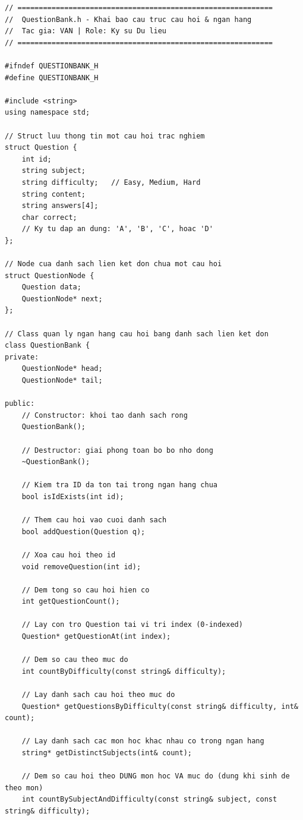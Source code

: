 \documentclass[11pt]{report}
\begin{document}
\begin{lstlisting}[caption={QuestionBank.h -- Khai báo cấu trúc câu hỏi và ngân hàng câu hỏi}, label={lst:full_qb_h}]
// ============================================================
//  QuestionBank.h - Khai bao cau truc cau hoi & ngan hang
//  Tac gia: VAN | Role: Ky su Du lieu
// ============================================================

#ifndef QUESTIONBANK_H
#define QUESTIONBANK_H

#include <string>
using namespace std;

// Struct luu thong tin mot cau hoi trac nghiem
struct Question {
    int id;
    string subject;
    string difficulty;   // Easy, Medium, Hard
    string content;
    string answers[4];
    char correct;
    // Ky tu dap an dung: 'A', 'B', 'C', hoac 'D'
};

// Node cua danh sach lien ket don chua mot cau hoi
struct QuestionNode {
    Question data;
    QuestionNode* next;
};

// Class quan ly ngan hang cau hoi bang danh sach lien ket don
class QuestionBank {
private:
    QuestionNode* head;
    QuestionNode* tail;

public:
    // Constructor: khoi tao danh sach rong
    QuestionBank();

    // Destructor: giai phong toan bo bo nho dong
    ~QuestionBank();

    // Kiem tra ID da ton tai trong ngan hang chua
    bool isIdExists(int id);

    // Them cau hoi vao cuoi danh sach
    bool addQuestion(Question q);

    // Xoa cau hoi theo id
    void removeQuestion(int id);

    // Dem tong so cau hoi hien co
    int getQuestionCount();

    // Lay con tro Question tai vi tri index (0-indexed)
    Question* getQuestionAt(int index);

    // Dem so cau theo muc do
    int countByDifficulty(const string& difficulty);

    // Lay danh sach cau hoi theo muc do
    Question* getQuestionsByDifficulty(const string& difficulty, int& count);

    // Lay danh sach cac mon hoc khac nhau co trong ngan hang
    string* getDistinctSubjects(int& count);

    // Dem so cau hoi theo DUNG mon hoc VA muc do (dung khi sinh de theo mon)
    int countBySubjectAndDifficulty(const string& subject, const string& difficulty);


\end{lstlisting}
\end{document}
